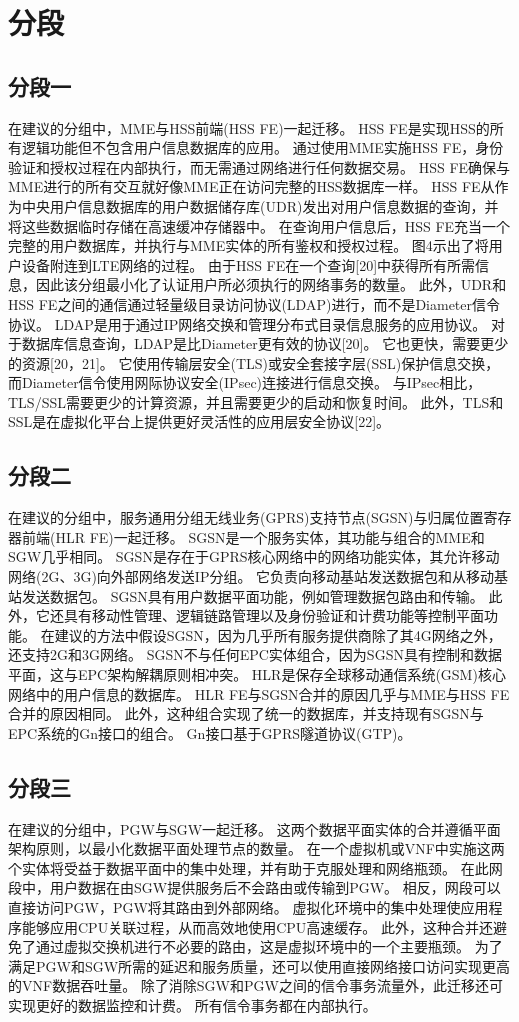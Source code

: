 \chapter{分段}
\section{分段一}
在建议的分组中，MME与HSS前端(HSS FE)一起迁移。
HSS FE是实现HSS的所有逻辑功能但不包含用户信息数据库的应用。
通过使用MME实施HSS FE，身份验证和授权过程在内部执行，而无需通过网络进行任何数据交易。
HSS FE确保与MME进行的所有交互就好像MME正在访问完整的HSS数据库一样。
HSS FE从作为中央用户信息数据库的用户数据储存库(UDR)发出对用户信息数据的查询，并将这些数据临时存储在高速缓冲存储器中。
在查询用户信息后，HSS FE充当一个完整的用户数据库，并执行与MME实体的所有鉴权和授权过程。
图4示出了将用户设备附连到LTE网络的过程。
由于HSS FE在一个查询[20]中获得所有所需信息，因此该分组最小化了认证用户所必须执行的网络事务的数量。
此外，UDR和HSS FE之间的通信通过轻量级目录访问协议(LDAP)进行，而不是Diameter信令协议。
LDAP是用于通过IP网络交换和管理分布式目录信息服务的应用协议。
对于数据库信息查询，LDAP是比Diameter更有效的协议[20]。
它也更快，需要更少的资源[20，21]。
它使用传输层安全(TLS)或安全套接字层(SSL)保护信息交换，而Diameter信令使用网际协议安全(IPsec)连接进行信息交换。
与IPsec相比，TLS/SSL需要更少的计算资源，并且需要更少的启动和恢复时间。
此外，TLS和SSL是在虚拟化平台上提供更好灵活性的应用层安全协议[22]。


\section{分段二}
在建议的分组中，服务通用分组无线业务(GPRS)支持节点(SGSN)与归属位置寄存器前端(HLR FE)一起迁移。
SGSN是一个服务实体，其功能与组合的MME和SGW几乎相同。
SGSN是存在于GPRS核心网络中的网络功能实体，其允许移动网络(2G、3G)向外部网络发送IP分组。
它负责向移动基站发送数据包和从移动基站发送数据包。
SGSN具有用户数据平面功能，例如管理数据包路由和传输。
此外，它还具有移动性管理、逻辑链路管理以及身份验证和计费功能等控制平面功能。
在建议的方法中假设SGSN，因为几乎所有服务提供商除了其4G网络之外，还支持2G和3G网络。
SGSN不与任何EPC实体组合，因为SGSN具有控制和数据平面，这与EPC架构解耦原则相冲突。
HLR是保存全球移动通信系统(GSM)核心网络中的用户信息的数据库。
HLR FE与SGSN合并的原因几乎与MME与HSS FE合并的原因相同。
此外，这种组合实现了统一的数据库，并支持现有SGSN与EPC系统的Gn接口的组合。
Gn接口基于GPRS隧道协议(GTP)。

\section{分段三}
在建议的分组中，PGW与SGW一起迁移。
这两个数据平面实体的合并遵循平面架构原则，以最小化数据平面处理节点的数量。
在一个虚拟机或VNF中实施这两个实体将受益于数据平面中的集中处理，并有助于克服处理和网络瓶颈。
在此网段中，用户数据在由SGW提供服务后不会路由或传输到PGW。
相反，网段可以直接访问PGW，PGW将其路由到外部网络。
虚拟化环境中的集中处理使应用程序能够应用CPU关联过程，从而高效地使用CPU高速缓存。
此外，这种合并还避免了通过虚拟交换机进行不必要的路由，这是虚拟环境中的一个主要瓶颈。
为了满足PGW和SGW所需的延迟和服务质量，还可以使用直接网络接口访问实现更高的VNF数据吞吐量。
除了消除SGW和PGW之间的信令事务流量外，此迁移还可实现更好的数据监控和计费。
所有信令事务都在内部执行。


